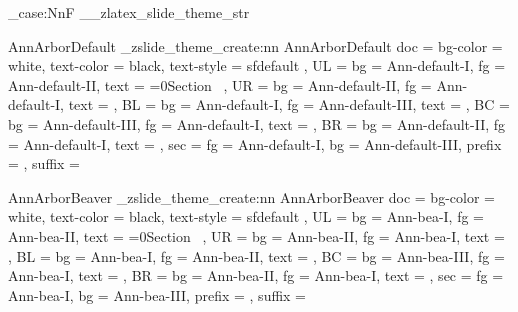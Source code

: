 \str_case:NnF \g__zlatex_slide_theme_str {
  {AnnArborDefault}{
    \_zslide_theme_create:nn {AnnArborDefault}{
      doc = {
        bg-color = white,
        text-color = black,
        text-style = sfdefault
      },
      UL = {
        bg   = Ann-default-I,
        fg   = Ann-default-II,
        text = {\ifnum{}=0\else Section\ \thesection\fi}
      },
      UR = {
        bg   = Ann-default-II,
        fg   = Ann-default-I,
        text = {\zslideDefaultUR}
      },
      BL = {
        bg   = Ann-default-I,
        fg   = Ann-default-III,
        text = \zslideAuthor
      },
      BC = {
        bg   = Ann-default-III,
        fg   = Ann-default-I,
        text = \zslideTitle
      },
      BR = {
        bg   = Ann-default-II,
        fg   = Ann-default-I,
        text = \zslideDefaultBR
      },
      sec = {
        fg   = Ann-default-I,
        bg   = Ann-default-III,
        prefix = {},
        suffix = {}
      }
    }
  }

  {AnnArborBeaver}{
    \_zslide_theme_create:nn {AnnArborBeaver}{ 
      doc = {
        bg-color = white,
        text-color = black,
        text-style = sfdefault
      },
      UL = {
        bg   = Ann-bea-I,
        fg   = Ann-bea-II, 
        text = {\ifnum{}=0\else Section\ \thesection\fi} 
      },
      UR = {
        bg   = Ann-bea-II,
        fg   = Ann-bea-I,
        text = {\zslideDefaultUR}
      },
      BL = {
        bg   = Ann-bea-I,
        fg   = Ann-bea-II,
        text = \zslideAuthor
      },
      BC = {
        bg   = Ann-bea-III,
        fg   = Ann-bea-I,
        text = \zslideTitle
      },
      BR = {
        bg   = Ann-bea-II,
        fg   = Ann-bea-I,
        text = \zslideDefaultBR 
      },
      sec = {
        fg   = Ann-bea-I,
        bg   = Ann-bea-III,
        prefix = {},
        suffix = {}
      }
    }
  }

}
